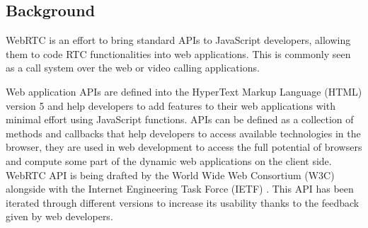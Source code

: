 %
%
%

\subsection{Background}

WebRTC is an effort to bring standard APIs to JavaScript developers, allowing them to code RTC functionalities into web applications. This is commonly seen as a call system over the web or video calling applications. 

Web application APIs are defined into the HyperText Markup Language (HTML)  version 5 and help developers to add features to their web applications with minimal effort using JavaScript functions. APIs can be defined as a collection of methods and callbacks that help developers to access available technologies in the browser, they are used in web development to access the full potential of browsers and compute some part of the dynamic web applications on the client side. WebRTC API is being drafted by the World Wide Web Consortium (W3C)  alongside with the Internet Engineering Task Force (IETF) . This API has been iterated through different versions to increase its usability thanks to the feedback given by web developers.

